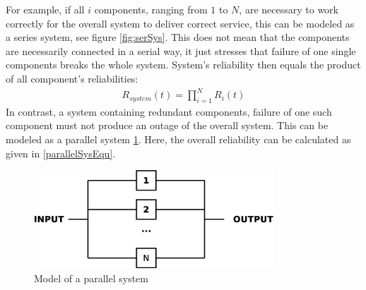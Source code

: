 For example, if all $i$ components, ranging from $1$ to $N$, are necessary to work correctly for the overall system to deliver correct service, this can be modeled as
a series system, see figure \ref{fig:serSys}. This does not mean that the components are necessarily connected in a serial way, it just stresses that failure
of one single components breaks the whole system. System's reliability then equals the product of all component's reliabilities:
\begin{align}
R_{system}(t) = \prod_{i=1}^{N} R_{i}(t) 
\end{align}
In contrast, a system containing redundant components, failure of one such component must not produce an outage of the overall system. This can be modeled as
a parallel system \ref{fig:parallelSys}. Here, the overall reliability can be calculated as given in \ref{parallelSysEqu}.
\begin{figure}
    \centering
    \includegraphics[width=0.8\textwidth]{figures/parallelSys.eps}
    \caption{Model of a parallel system}
    \label{fig:parallelSys}
\end{figure}

